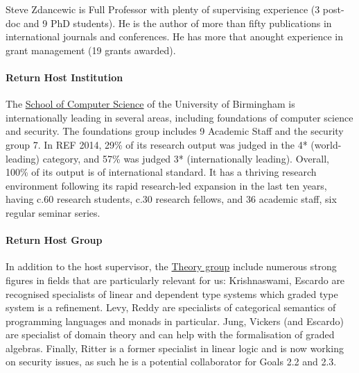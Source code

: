 \documentclass{article}[11pt]
\begin{document}
Steve Zdancewic %
is Full Professor with plenty of supervising experience (3 post-doc and 9 PhD students). He is the author of more than fifty publications in international journals and conferences. He has more that anought experience in grant management (19 grants awarded).


\paragraph{Return Host Institution}
The \href{http://www.cs.bham.ac.uk/}{School of Computer Science} of the University of Birmingham is
internationally leading in several areas, including foundations of
computer science and security. The foundations group includes 9
Academic Staff and the security group 7. In REF 2014, 29\% of its
research output was judged in the 4* (world-leading) category, and
57\% was judged 3* (internationally leading). Overall, 100\% of its
output is of international standard. It has a thriving research
environment following its rapid research-led expansion in the last ten
years, having c.60 research students, c.30 research fellows, and 36
academic staff, six regular seminar series.


\paragraph{Return Host Group}
In addition to the host supervisor, the \href{http://www.cs.bham.ac.uk/research/groupings/theory/}{Theory group} include numerous strong figures in fields that are particularly relevant for us: Krishnaswami, Escardo are recognised specialists of linear and dependent type systems which graded type system is a refinement. Levy, Reddy are specialists of categorical semantics of programming languages and monads in particular. Jung, Vickers (and Escardo) are specialist of domain theory and can help with the formalisation of graded algebras. Finally,  Ritter is a former specialist in linear logic and is now working on security issues, as such he is a potential collaborator for Goals 2.2 and 2.3. 
\end{document}

